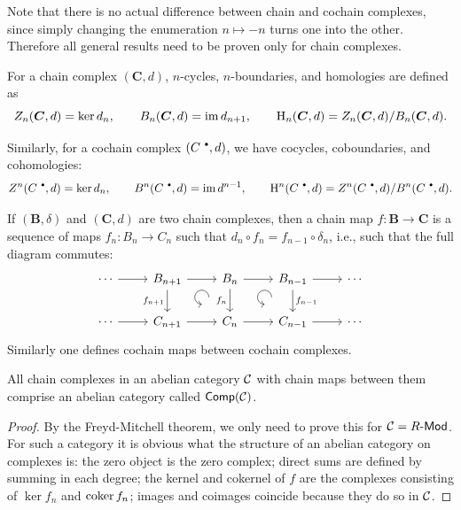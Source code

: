 Note that there is no actual difference between chain and cochain complexes, since simply changing the enumeration $n\mapsto -n$ turns one into the other. Therefore all general results need to be proven only for chain complexes.

\begin{defn}
    For a chain complex $(\bm{C},d)$, $n$-cycles, $n$-boundaries, and homologies are defined as 
    \[Z_n(\boldsymbol{C},d)=\ker d_n,\quad\quad B_n(\boldsymbol{C},d)=\operatorname{im} d_{n+1},\quad\quad \mathrm{H}_n(\boldsymbol{C},d)=Z_n(\boldsymbol{C},d)/B_n(\boldsymbol{C},d).\]
    
    Similarly, for a cochain complex $(C^{\smbullet },d)$, we have cocycles, coboundaries, and cohomologies:
    \[Z^n(C^{\smbullet },d)=\ker d_n,\quad\quad B^n(C^{\smbullet },d)=\im d^{n-1},\quad\quad \rmH^n(C^{\smbullet },d)=Z^n(C^{\smbullet },d)/B^n(C^{\smbullet },d).\]
\end{defn}

\begin{defn}
    If $(\bm{B},\delta )$ and $(\bm{C},d)$ are two chain complexes, then a chain map $f:\bm{B}\to \bm{C}$ is a sequence of maps $f_n:B_n\to C_n$ such that $d_n\circ f_n=f_{n-1}\circ \delta_n$, i.e., such that the full diagram commutes:
    \[\begin{tikzcd}[every matrix/.append style={name=m},
        execute at end picture={\draw [<-] ([xshift=-8mm,yshift=-10mm]m-1-3.north) arc[start angle=-90,delta angle=-270,radius=0.2cm];
        \draw [<-] ([xshift=-8mm,yshift=-10mm]m-1-4.north) arc[start angle=-90,delta angle=-270,radius=0.2cm];}]
        \cdots\arrow[r] & B_{n+1}\arrow[r]\arrow[d,swap,"f_{n+1}"] & B_{n} \arrow[r]\arrow[d,swap,"f_n"] & B_{n-1}\arrow[d,"f_{n-1}"]\arrow[r] & \cdots \\
       \cdots\arrow[r] & C_{n+1}\arrow[r] & C_n\arrow[r] &C_{n-1} \arrow[r] &\cdots
    \end{tikzcd}\]
    Similarly one defines cochain maps between cochain complexes.
\end{defn}

\begin{prop}
    All chain complexes in an abelian category $\mathcal{C}$ with chain maps between them comprise an abelian category called $\mathsf{Comp}(\mathcal{C})$.
\end{prop}
\begin{proof}
    By the Freyd-Mitchell theorem, we only need to prove this for $\mathcal{C}=R\text{-}\mathsf{Mod}$. For such a category it is obvious what the structure of an abelian category on complexes is: the zero object is the zero complex; direct sums are defined by summing in each degree; the kernel and cokernel of $f$ are the complexes consisting of $\ker f_n$ and $\operatorname{coker} f_n$; images and coimages coincide because they do so in $\mathcal{C}$.
\end{proof}

